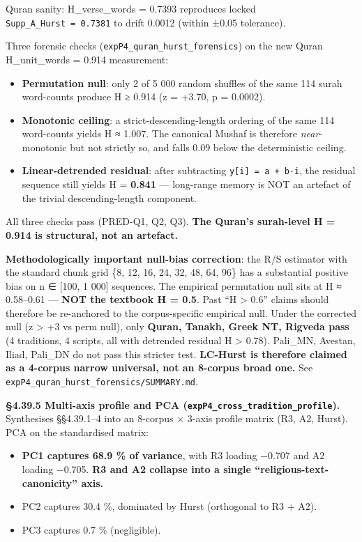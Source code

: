 \documentclass[
]{article}
\providecommand{\tightlist}{%
  \setlength{\itemsep}{0pt}\setlength{\parskip}{0pt}}
\begin{document}
Quran sanity: H\_verse\_words = 0.7393 reproduces locked
\texttt{Supp\_A\_Hurst\ =\ 0.7381} to drift 0.0012 (within ±0.05
tolerance).

Three forensic checks (\texttt{expP4\_quran\_hurst\_forensics}) on the
new Quran H\_unit\_words = 0.914 measurement:

\begin{itemize}
\tightlist
\item
  \textbf{Permutation null}: only 2 of 5 000 random shuffles of the same
  114 surah word-counts produce H ≥ 0.914 (z = +3.70, p = 0.0002).
\item
  \textbf{Monotonic ceiling}: a strict-descending-length ordering of the
  same 114 word-counts yields H ≈ 1.007. The canonical Mushaf is
  therefore \emph{near}-monotonic but not strictly so, and falls 0.09
  below the deterministic ceiling.
\item
  \textbf{Linear-detrended residual}: after subtracting
  \texttt{y{[}i{]}\ =\ a\ +\ b·i}, the residual sequence still yields H
  = \textbf{0.841} --- long-range memory is NOT an artefact of the
  trivial descending-length component.
\end{itemize}

All three checks pass (PRED-Q1, Q2, Q3). \textbf{The Quran's surah-level
H = 0.914 is structural, not an artefact.}

\textbf{Methodologically important null-bias correction}: the R/S
estimator with the standard chunk grid \{8, 12, 16, 24, 32, 48, 64, 96\}
has a substantial positive bias on n ∈ {[}100, 1 000{]} sequences. The
empirical permutation null sits at H ≈ 0.58--0.61 --- \textbf{NOT the
textbook H = 0.5}. Past ``H \textgreater{} 0.6'' claims should therefore
be re-anchored to the corpus-specific empirical null. Under the
corrected null (z \textgreater{} +3 vs perm null), only \textbf{Quran,
Tanakh, Greek NT, Rigveda pass} (4 traditions, 4 scripts, all with
detrended residual H \textgreater{} 0.78). Pali\_MN, Avestan, Iliad,
Pali\_DN do not pass this stricter test. \textbf{LC-Hurst is therefore
claimed as a 4-corpus narrow universal, not an 8-corpus broad one.} See
\texttt{expP4\_quran\_hurst\_forensics/SUMMARY.md}.

\textbf{§4.39.5 Multi-axis profile and PCA
(\texttt{expP4\_cross\_tradition\_profile}).} Synthesises §§4.39.1--4
into an 8-corpus × 3-axis profile matrix (R3, A2, Hurst). PCA on the
standardised matrix:

\begin{itemize}
\tightlist
\item
  \textbf{PC1 captures 68.9 \% of variance}, with R3 loading −0.707 and
  A2 loading −0.705. \textbf{R3 and A2 collapse into a single
  ``religious-text-canonicity'' axis.}
\item
  PC2 captures 30.4 \%, dominated by Hurst (orthogonal to R3 + A2).
\item
  PC3 captures 0.7 \% (negligible).
\end{itemize}
\end{document}
